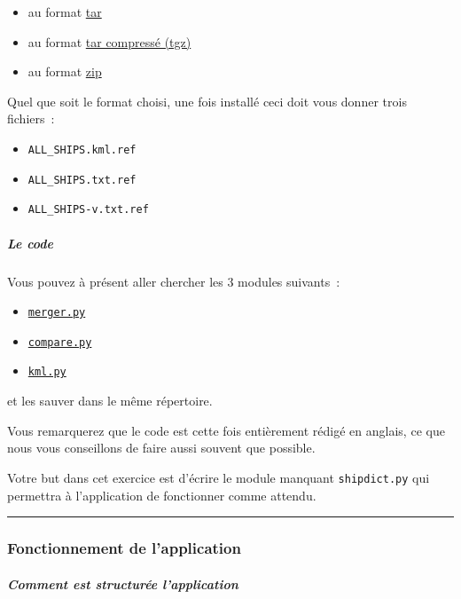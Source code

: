 \begin{itemize}
\tightlist
\item
  au format \href{data/ships-ref.tar}{tar}
\item
  au format \href{data/ships-ref.tgz}{tar compressé (tgz)}
\item
  au format \href{data/ships-ref.zip}{zip}
\end{itemize}

Quel que soit le format choisi, une fois installé ceci doit vous donner
trois fichiers~:

\begin{itemize}
\tightlist
\item
  \texttt{ALL\_SHIPS.kml.ref}
\item
  \texttt{ALL\_SHIPS.txt.ref}
\item
  \texttt{ALL\_SHIPS-v.txt.ref}
\end{itemize}

    \hypertarget{le-code}{%
\subparagraph{Le code}\label{le-code}}

    Vous pouvez à présent aller chercher les 3 modules suivants~:

\begin{itemize}
\tightlist
\item
  \href{data/merger.py}{\texttt{merger.py}}
\item
  \href{data/compare.py}{\texttt{compare.py}}
\item
  \href{data/kml.py}{\texttt{kml.py}}
\end{itemize}

et les sauver dans le même répertoire.

Vous remarquerez que le code est cette fois entièrement rédigé en
anglais, ce que nous vous conseillons de faire aussi souvent que
possible.

Votre but dans cet exercice est d'écrire le module manquant
\texttt{shipdict.py} qui permettra à l'application de fonctionner comme
attendu.

    \begin{center}\rule{0.5\linewidth}{\linethickness}\end{center}

    \hypertarget{fonctionnement-de-lapplication}{%
\subsubsection{Fonctionnement de
l'application}\label{fonctionnement-de-lapplication}}

    \hypertarget{comment-est-structuruxe9e-lapplication}{%
\subparagraph{Comment est structurée
l'application}\label{comment-est-structuruxe9e-lapplication}}


